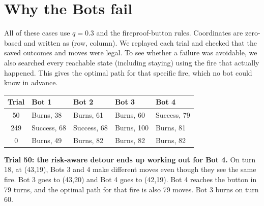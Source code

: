 \documentclass[11pt]{article}
\begin{document}
\section{Why the Bots fail}

All of these cases use $q = 0.3$ and the fireproof-button rules. Coordinates are zero-based and written as (row, column). We replayed each trial and checked that the saved outcomes and moves were legal. To see whether a failure was avoidable, we also searched every reachable state (including staying) using the fire that actually happened. This gives the optimal path for that specific fire, which no bot could know in advance.

\begin{center}
\begin{tabular}{cllll}
\toprule
Trial & Bot 1 & Bot 2 & Bot 3 & Bot 4 \\
\midrule
50 & Burns, 38 & Burns, 61 & Burns, 60 & Success, 79 \\
249 & Success, 68 & Success, 68 & Burns, 100 & Burns, 81 \\
0 & Burns, 49 & Burns, 82 & Burns, 82 & Burns, 82 \\
\bottomrule
\end{tabular}
\end{center}

\textbf{Trial 50: the risk-aware detour ends up working out for Bot 4.} On turn 18, at (43,19), Bots 3 and 4 make different moves even though they see the same fire. Bot 3 goes to (43,20) and Bot 4 goes to (42,19). Bot 4 reaches the button in 79 turns, and the optimal path for that fire is also 79 moves. Bot 3 burns on turn 60.
\end{document}
